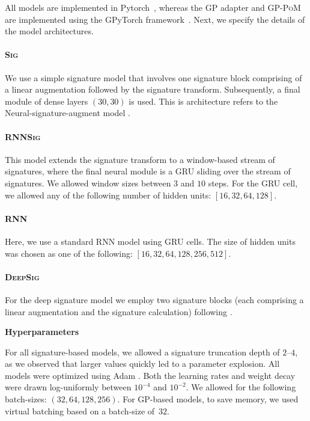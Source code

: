 \documentclass{article}
\renewcommand{\subsubsection}[1]{\textbf{#1}

} %
\begin{document}
All models are implemented in Pytorch~\citep{pytorch2019}, whereas the
GP adapter and \textsc{GP-PoM} are implemented using the GPyTorch
framework~\citep{gardner2018gpytorch}. Next, we specify the details of
the model architectures.

\paragraph{\textsc{Sig}}
We use a simple signature model that involves one        signature block comprising of a linear
    augmentation followed by the signature transform. Subsequently, a final module of dense layers $(30,30)$ is used. This is architecture refers to the Neural-signature-augment model \cite{kidger2019deep}.
  \paragraph{\textsc{RNNSig}} This model extends the signature transform to a window-based
    stream of signatures, where the final neural module is a GRU
    sliding over the stream of signatures. We allowed window sizes between $3$ and $10$ steps. For the GRU cell, we allowed any of the following number of hidden units: $[16,32,64,128]$.
    
  \paragraph{\textsc{RNN}} Here, we use a standard RNN model using GRU cells. The size of hidden units was chosen as one of the following: $[16,32,64,128, 256, 512]$.
  \paragraph{\textsc{DeepSig}} For the deep signature model we  employ two signature blocks (each comprising a linear augmentation and the signature calculation) following \citet{kidger2019deep}.

\subsubsection{Hyperparameters}

For all signature-based models, we allowed a signature truncation
depth of $2$--$4$, as we observed that larger values quickly led to
a parameter explosion. All models were optimized using Adam
\citep{kingma2014adam}. Both the learning rates and weight decay
were drawn log-uniformly between $10^{-4}$ and $10^{-2}$. We allowed
for the following batch-sizes: $(32, 64, 128, 256)$. For GP-based
models, to save memory, we used virtual batching based on
a batch-size of~$32$. 
    
\end{document}
